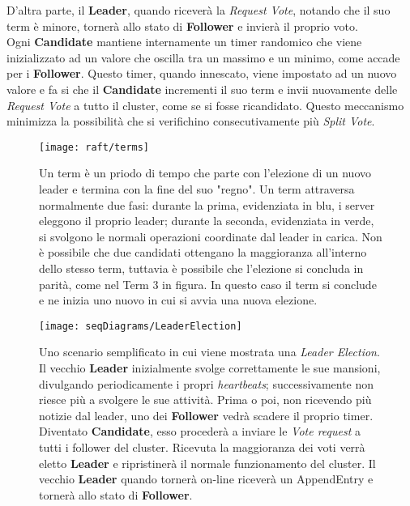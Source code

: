 D'altra parte, il \textbf{Leader}, quando riceverà la \textit{Request Vote}, notando che il suo term è minore, tornerà allo stato di \textbf{Follower} e invierà il proprio voto.
\\
Ogni \textbf{Candidate} mantiene internamente un timer randomico che viene inizializzato ad un valore che oscilla tra un massimo e un minimo, come accade per i \textbf{Follower}.
Questo timer, quando innescato, viene impostato ad un nuovo valore e fa si che il \textbf{Candidate} incrementi il suo term e invii nuovamente delle \textit{Request Vote} a tutto il cluster, come se si fosse ricandidato. Questo meccanismo minimizza la possibilità che si verifichino consecutivamente più \textit{Split Vote}.


\begin{figure}[H]
	\centering
	\texttt{[image: raft/terms]}
	\caption{Un term è un priodo di tempo che parte con l'elezione di un nuovo leader e termina con la fine del suo "regno". 
		Un term attraversa normalmente due fasi: durante la prima, evidenziata in blu, i server eleggono il proprio leader; durante la seconda, evidenziata in verde, si svolgono le normali operazioni coordinate dal leader in carica.
		Non è possibile che due candidati ottengano la maggioranza all'interno dello stesso term, tuttavia è possibile che l'elezione si concluda in parità, come nel Term 3 in figura. In questo caso il term si conclude e ne inizia uno nuovo in cui si avvia una nuova elezione.}
	\label{fig:figure3}
\end{figure}


\begin{figure}[H]
	\centering
	\texttt{[image: seqDiagrams/LeaderElection]}
	\caption{Uno scenario semplificato in cui viene mostrata una \textit{Leader Election}. Il vecchio \textbf{Leader} inizialmente svolge correttamente le sue mansioni, divulgando periodicamente i propri \textit{heartbeats}; successivamente non riesce più a svolgere le sue attività. Prima o poi, non ricevendo più notizie dal leader, uno dei \textbf{Follower} vedrà scadere il proprio timer. Diventato \textbf{Candidate}, esso procederà a inviare le \textit{Vote request} a tutti i follower del cluster. Ricevuta la maggioranza dei voti verrà eletto \textbf{Leader} e ripristinerà il normale funzionamento del cluster. Il vecchio \textbf{Leader} quando tornerà on-line riceverà un AppendEntry e tornerà allo stato di \textbf{Follower}.}
	\label{fig:figure4}
\end{figure}


